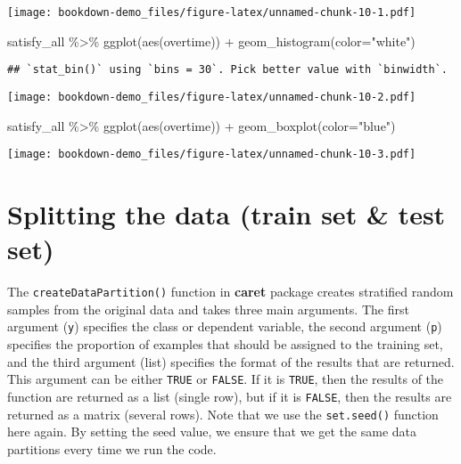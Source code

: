 \documentclass[
]{book}
\newenvironment{Shaded}{\begin{snugshade}}{\end{snugshade}}
\newcommand{\AttributeTok}[1]{\textcolor[rgb]{0.77,0.63,0.00}{#1}}
\newcommand{\FunctionTok}[1]{\textcolor[rgb]{0.00,0.00,0.00}{#1}}
\newcommand{\NormalTok}[1]{#1}
\newcommand{\SpecialCharTok}[1]{\textcolor[rgb]{0.00,0.00,0.00}{#1}}
\newcommand{\StringTok}[1]{\textcolor[rgb]{0.31,0.60,0.02}{#1}}
\begin{document}
\texttt{[image: bookdown-demo\_files/figure-latex/unnamed-chunk-10-1.pdf]}

\begin{Shaded}
\begin{Highlighting}[]
\NormalTok{satisfy\_all }\SpecialCharTok{\%\textgreater{}\%}
  \FunctionTok{ggplot}\NormalTok{(}\FunctionTok{aes}\NormalTok{(overtime)) }\SpecialCharTok{+}
  \FunctionTok{geom\_histogram}\NormalTok{(}\AttributeTok{color=}\StringTok{"white"}\NormalTok{)}
\end{Highlighting}
\end{Shaded}

\begin{verbatim}
## `stat_bin()` using `bins = 30`. Pick better value with `binwidth`.
\end{verbatim}

\texttt{[image: bookdown-demo\_files/figure-latex/unnamed-chunk-10-2.pdf]}

\begin{Shaded}
\begin{Highlighting}[]
\NormalTok{satisfy\_all }\SpecialCharTok{\%\textgreater{}\%}
  \FunctionTok{ggplot}\NormalTok{(}\FunctionTok{aes}\NormalTok{(overtime)) }\SpecialCharTok{+}
  \FunctionTok{geom\_boxplot}\NormalTok{(}\AttributeTok{color=}\StringTok{"blue"}\NormalTok{)}
\end{Highlighting}
\end{Shaded}

\texttt{[image: bookdown-demo\_files/figure-latex/unnamed-chunk-10-3.pdf]}

\hypertarget{splitting-the-data-train-set-test-set-1}{%
\section{Splitting the data (train set \& test set)}\label{splitting-the-data-train-set-test-set-1}}

The \texttt{createDataPartition()} function in \textbf{caret} package creates stratified random samples from the original data and takes three main arguments. The first argument (\texttt{y}) specifies the class or dependent variable, the second argument (\texttt{p}) specifies the proportion of examples that should be assigned to the training set, and the third argument (list) specifies the format of the results that are returned. This argument can be either \texttt{TRUE} or \texttt{FALSE}. If it is \texttt{TRUE}, then the results of the function are returned as a list (single row), but if it is \texttt{FALSE}, then the results are returned as a matrix (several rows). Note that we use the \texttt{set.seed()} function here again. By setting the seed value, we ensure that we get the same data partitions every time we run the code.
\end{document}

